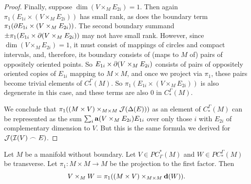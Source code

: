 \begin{proof}
	Finally, suppose $\dim(V \times_M E_{2i}) = 1$.
	Then again $\pi_1(E_{1i} \times (V \times_M E_{2i}))$ has small rank, as does the boundary term $\pi_1(\partial E_{1i} \times (V \times_M E_{2i}))$.
	The second boundary summand $\pm\pi_1(E_{1i} \times \partial(V \times_M E_{2i}))$ may not have small rank.
	However, since $\dim(V \times_M E_{2i}) = 1$, it must consist of mappings of circles and compact intervals, and, therefore, its boundary consists of (maps to $M$ of) pairs of oppositely oriented points.
	So $E_{1i} \times \partial(V \times_M E_{2i})$ consists of pairs of oppositely oriented copies of $E_{1i}$ mapping to $M \times M$, and once we project via $\pi_1$, these pairs become trivial elements of $C^\Gamma_*(M)$.
	So $\pi_1(E_{1i} \times (V \times_M E_{2i}))$ is also degenerate in this case, and these terms are also $0$ in $C^\Gamma_*(M)$.

	We conclude that $\pi_1( (M \times V)\times_{M \times M}\mathcal{J}(\Delta(E)))$ as an element of $C_*^\Gamma(M)$ can be represented as the sum $\sum_i \mathbf{a}(V \times_M E_{2i})E_{1i}$ over only those $i$ with $E_{2i}$ of complementary dimension to $V$.
	But this is the same formula we derived for $\mathcal{J}(\mathcal{I}(V)\frown E)$.
\end{proof}

\begin{lemma}\label{L: diagonal version of intersection}
	Let $M$ be a manifold without boundary.
	Let $V \in PC^*_\Gamma(M)$ and $W \in PC_*^\Gamma(M)$ be transverse.
	Let $\pi_1 \colon M \times M \to M$ be the projection to the first factor.
	Then $$V \times_M W = \pi_1((M \times V)\times_{M \times M} \mathbf{d}(W)).$$
\end{lemma}

